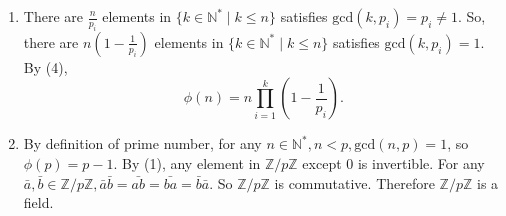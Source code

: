 \documentclass[12pt]{article}
\newcommand{\NN}{\mathbb{N}}
\newcommand{\ZZ}{\mathbb{Z}}
\begin{document}
\begin{enumerate}
\begin{enumerate}
                    \item There are $\frac{n}{p_i}$ elements in $\{k\in\NN^{*}\mid k\le n\}$ satisfies $\mathrm{gcd}(k,p_i)=p_i\not=1$. So, there are $n(1-\frac{1}{p_i})$ elements in $\{k\in\NN^{*}\mid k\le n\}$ satisfies $\mathrm{gcd}(k,p_i)=1$. By (4),
                        $$\phi(n)=n\prod_{i=1}^{k}(1-\frac{1}{p_i}).$$
                    \item By definition of prime number, for any $n\in \NN^{*}, n<p, \mathrm{gcd}(n,p)=1$, so $\phi(p)=p-1.$ By (1), any element in $\ZZ/p\ZZ$ except $0$ is invertible. For any $\bar{a},\bar{b}\in \ZZ/p\ZZ, \bar{a}\bar{b}=\bar{ab}=\bar{ba}=\bar{b}\bar{a}.$ So $\ZZ/p\ZZ$ is commutative. Therefore $\ZZ/p\ZZ$ is a field. 
            \end{enumerate}
\end{enumerate}
\end{document}
